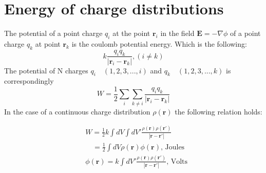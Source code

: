 \section{Energy of charge distributions}
The potential of a point charge $q_i$ at the point $\textbf{r}_i$ in the field $\scriptstyle \textbf{E} = - \nabla \phi$
of a point charge $q_k$ at point $\textbf{r}_k$ is the coulomb potential energy. Which is the following:
\begin{equation}
    k \frac{q_iq_k}{|\textbf{r}_i-\textbf{r}_k|}, (i \neq k)
\end{equation}
The potential of N charges $q_i \quad (1,2,3,...,i)$ and $q_k \quad (1,2,3,...,k)$ is correspondingly
\begin{equation}
    W = \frac{1}{2}\sum_i\sum_{k\neq i}\frac{q_iq_k}{|\textbf{r}_i-\textbf{r}_k|}
\end{equation}
In the case of a continuous charge distribution $\rho(\textbf{r})$ the following relation holds:

\begin{equation}
    \begin{aligned}
        &W =  \frac{1}{2}k \int dV\int dV'\frac{\rho(\textbf{r})\rho(\textbf{r}')}{|\textbf{r}-\textbf{r}'|} \\
        &\quad = \frac{1}{2}\int dV \rho(\textbf{r})\phi(\textbf{r}) \text{, Joules} \\
        &\phi(\textbf{r}) = k\int  dV'\frac{\rho(\textbf{r})\rho(\textbf{r}')}{|\textbf{r}-\textbf{r}'|} \text{, Volts}\\ 
    \end{aligned}
\end{equation}

